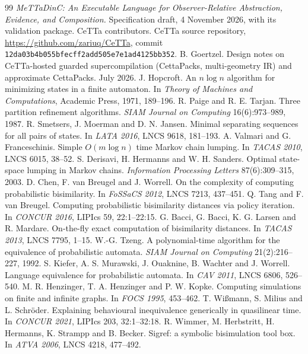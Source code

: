 \documentclass[11pt]{article}
\newcommand{\code}[1]{\texttt{#1}}
\begin{document}
\begin{thebibliography}{99}\small
{} \emph{MeTTaDinC: An Executable Language for Observer-Relative Abstraction, Evidence, and Composition.} Specification draft, 4 November 2026, with its validation package.
 CeTTa contributors. CeTTa source repository, \url{https://github.com/zariuq/CeTTa}, commit \code{12da03b4b055bfecff2add505e7e1ad4125bb352}.
 B. Goertzel. Design notes on CeTTa-hosted guarded supercompilation (CettaPacks, multi-geometry IR) and approximate CettaPacks. July 2026.
 J. Hopcroft. An $n\log n$ algorithm for minimizing states in a finite automaton. In \emph{Theory of Machines and Computations}, Academic Press, 1971, 189--196.
 R. Paige and R. E. Tarjan. Three partition refinement algorithms. \emph{SIAM Journal on Computing} 16(6):973--989, 1987.
 R. Smetsers, J. Moerman and D. N. Jansen. Minimal separating sequences for all pairs of states. In \emph{LATA 2016}, LNCS 9618, 181--193.
 A. Valmari and G. Franceschinis. Simple $O(m\log n)$ time Markov chain lumping. In \emph{TACAS 2010}, LNCS 6015, 38--52.
 S. Derisavi, H. Hermanns and W. H. Sanders. Optimal state-space lumping in Markov chains. \emph{Information Processing Letters} 87(6):309--315, 2003.
 D. Chen, F. van Breugel and J. Worrell. On the complexity of computing probabilistic bisimilarity. In \emph{FoSSaCS 2012}, LNCS 7213, 437--451.
 Q. Tang and F. van Breugel. Computing probabilistic bisimilarity distances via policy iteration. In \emph{CONCUR 2016}, LIPIcs 59, 22:1--22:15.
 G. Bacci, G. Bacci, K. G. Larsen and R. Mardare. On-the-fly exact computation of bisimilarity distances. In \emph{TACAS 2013}, LNCS 7795, 1--15.
 W.-G. Tzeng. A polynomial-time algorithm for the equivalence of probabilistic automata. \emph{SIAM Journal on Computing} 21(2):216--227, 1992.
 S. Kiefer, A. S. Murawski, J. Ouaknine, B. Wachter and J. Worrell. Language equivalence for probabilistic automata. In \emph{CAV 2011}, LNCS 6806, 526--540.
 M. R. Henzinger, T. A. Henzinger and P. W. Kopke. Computing simulations on finite and infinite graphs. In \emph{FOCS 1995}, 453--462.
 T. Wi\ss{}mann, S. Milius and L. Schr\"oder. Explaining behavioural inequivalence generically in quasilinear time. In \emph{CONCUR 2021}, LIPIcs 203, 32:1--32:18.
 R. Wimmer, M. Herbstritt, H. Hermanns, K. Strampp and B. Becker. Sigref: a symbolic bisimulation tool box. In \emph{ATVA 2006}, LNCS 4218, 477--492.

\end{thebibliography}
\end{document}
